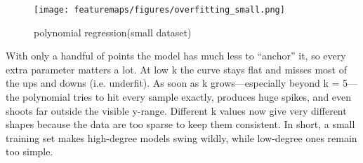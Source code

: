 \begin{answer}
\begin{figure}[htbp]
  \centering
  \texttt{[image: featuremaps/figures/overfitting\_small.png]}
  \caption{polynomial regression(small dataset)}
  \label{fig:polynomial regression}
\end{figure}
With only a handful of points the model has much less to “anchor” it, so every extra parameter matters a lot. At low k the curve stays flat and misses most of the ups and downs (i.e. underfit). As soon as k grows—especially beyond k = 5—the polynomial tries to hit every sample exactly, produces huge spikes, and even shoots far outside the visible y-range. Different k values now give very different shapes because the data are too sparse to keep them consistent. In short, a small training set makes high-degree models swing wildly, while low-degree ones remain too simple.
\end{answer}

